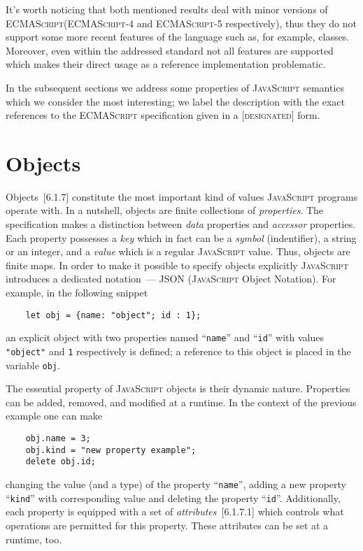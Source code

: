 \documentclass{article}
\newcommand{\js}{\textsc{JavaScript}\xspace}
\newcommand{\es}{\textsc{ECMAScript}\xspace}
\newcommand{\rf}[1]{[\textsc{#1}]}
\begin{document}
It's worth noticing that both mentioned results deal with minor versions of \es (\es-4 and \es-5 respectively), thus
they do not support some more recent features of the language such as, for example, classes. Moreover, even
within the addressed standard not all features are supported which makes their direct usage as a reference
implementation problematic.

In the subsequent sections we address some properties of \js semantics which we consider the most interesting; we
label the description with the exact references to the \es specification given in a \rf{designated} form.

\section{Objects}
\label{sec:model}

Objects~\rf{6.1.7} constitute the most important kind of values \js programs operate with. In a nutshell, objects are
finite collections of \emph{properties}. The specification makes a distinction between \emph{data} properties and \emph{accessor}
properties. Each property possesses a \emph{key} which in fact can be a \emph{symbol}
(indentifier), a string or an integer, and a \emph{value} which is a regular \js value. Thus, objects are finite maps.
In order to make it possible to specify objects explicitly \js introduces a dedicated notation~--- JSON (\js Object Notation).
For example, in the following snippet

\begin{lstlisting}
    let obj = {name: "object"; id : 1};
\end{lstlisting}

an explicit object with two properties named ``\lstinline|name|'' and ``\lstinline|id|'' with values \lstinline|"object"| and
\lstinline|1| respectively is defined; a reference to this object is placed in the variable \lstinline|obj|.

The essential property of \js objects is their dynamic nature. Properties can be added, removed, and modified at a runtime.
In the context of the previous example one can make

\begin{lstlisting}
    obj.name = 3;
    obj.kind = "new property example";
    delete obj.id;
\end{lstlisting}

changing the value (and a type) of the property ``\lstinline|name|'', adding a new property ``\lstinline|kind|'' with
corresponding value and deleting the property ``\lstinline|id|''. Additionally, each property is equipped with a set
of \emph{attributes}~\rf{6.1.7.1} which controls what operations are permitted for this property. These attributes can
be set at a runtime, too. 
\end{document}
